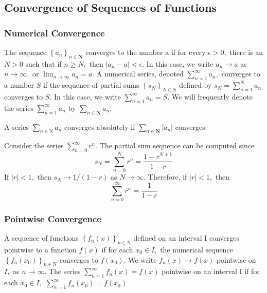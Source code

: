 \subsection{Convergence of Sequences of Functions}
\subsubsection{Numerical Convergence}
\begin{definition}
 The sequence $\left\{a_{n}\right\}_{n \in \mathbf{N}}$ converges to the number a if for
every $\epsilon>0,$ there is an $N>0$ such that if $n \geq N,$ then $\left|a_{n}-a\right|<\epsilon .$ In this case,
we write $a_{n} \rightarrow a$ as $n \rightarrow \infty,$ or $\lim _{n \rightarrow \infty} a_{n}=a$.
A numerical series, denoted $\sum_{n=1}^{\infty} a_{n},$ converges to a number $S$ if the sequence
of partial sums $\left\{s_{N}\right\}_{N \in \mathrm{N}}$ defined by $s_{N}=\sum_{n=1}^{N} a_{n}$ converges to $S .$ In this
case, we write $\sum_{n=1}^{\infty} a_{n}=S .$ We will frequently denote the series $\sum_{n=1}^{\infty} a_{n}$ by
$\sum_{n \in \mathbf{N}} a_{n} .$

A series $\sum_{n \in \mathrm{N}} a_{n}$ converges absolutely if $\sum_{n \in \mathbf{N}}\left|a_{n}\right|$ converges.

\end{definition}

\begin{ex}
Consider the series $\sum_{n=0}^{\infty} r^{n} .$ The partial sum sequence can be computed since
$$
s_{N}=\sum_{n=0}^{N} r^{n}=\frac{1-r^{N+1}}{1-r}
$$
If $|r|<1,$ then $s_{N} \rightarrow 1 /(1-r)$ as $N \rightarrow \infty .$ Therefore, if $|r|<1,$ then
$$
\sum_{n=0}^{\infty} r^{n}=\frac{1}{1-r}
$$
\end{ex}

\subsubsection{Pointwise Convergence}
\begin{definition}
 A sequence of functions $\left\{f_{n}(x)\right\}_{n \in \mathrm{N}}$ defined on an interval I converges pointwise to a function $f(x)$ if for each $x_{0} \in I,$ the numerical sequence
$\left\{f_{n}\left(x_{0}\right)\right\}_{n \in \mathrm{N}}$ converges to $f\left(x_{0}\right) .$ We write $f_{n}(x) \rightarrow f(x)$ pointwise on $I,$ as
$n \rightarrow \infty$.
The series $\sum_{n=1}^{\infty} f_{n}(x)=f(x)$ pointwise on an interval I if for each $x_{0} \in I,$
$\sum_{n=1}^{\infty} f_{n}\left(x_{0}\right)=f\left(x_{0}\right)$
\end{definition}


